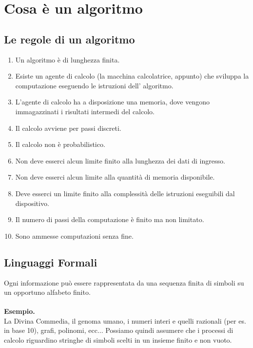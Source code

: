 \chapter{Cosa è un algoritmo}\label{ch:descrizione}
\section{Le regole di un algoritmo}
\begin{enumerate}
    \item Un algoritmo è di lunghezza finita.
    
    \item Esiste un agente di calcolo (la macchina calcolatrice, appunto) che sviluppa la computazione eseguendo le istruzioni dell’ algoritmo.
    
    \item L’agente di calcolo ha a disposizione una memoria, dove vengono immagazzinati i risultati intermedi del calcolo.
    
    \item Il calcolo avviene per passi discreti.
    
    \item Il calcolo non è probabilistico.
    
    \item Non deve esserci alcun limite finito alla lunghezza dei dati di ingresso.
    
    \item  Non deve esserci alcun limite alla quantità di memoria disponibile.
    
    \item Deve esserci un limite finito alla complessità delle istruzioni eseguibili dal dispositivo.
    
    \item Il numero di passi della computazione è finito ma non limitato.
    
    \item Sono ammesse computazioni senza fine.
\end{enumerate}

\section{Linguaggi Formali}
Ogni informazione può essere rappresentata da una sequenza finita di simboli su un opportuno alfabeto finito.\\\\
\textbf{Esempio.}\\La Divina Commedia, il genoma umano, i numeri interi e quelli razionali (per es. in base 10), grafi, polinomi, ecc... Possiamo quindi assumere che i processi di calcolo riguardino stringhe di simboli scelti in un insieme finito e non vuoto.


